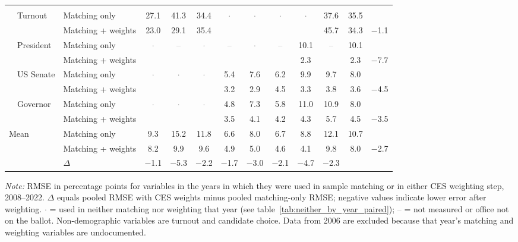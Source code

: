 \begin{table}[!htbp]
{\begin{threeparttable}
\begin{tabular}{llcccccccccc}
\addlinespace[0.3em]
\multicolumn{12}{l}{Non-demographic} \\
\addlinespace[0.1em]
~~Turnout & Matching only & 27.1 & 41.3 & 34.4 & \textcolor{gray}{$\cdot$} & \textcolor{gray}{$\cdot$} & \textcolor{gray}{$\cdot$} & \textcolor{gray}{$\cdot$} & 37.6 & 35.5 & \\
 & Matching + weights & 23.0 & 29.1 & 35.4 &  &  &  &  & 45.7 & 34.3 & $-$1.1 \\
\addlinespace[0.1em]
~~President & Matching only & \textcolor{gray}{$\cdot$} & \textcolor{gray}{--} & \textcolor{gray}{$\cdot$} & \textcolor{gray}{--} & \textcolor{gray}{$\cdot$} & \textcolor{gray}{--} & 10.1 & \textcolor{gray}{--} & 10.1 & \\
 & Matching + weights &  &  &  &  &  &  & 2.3 &  & 2.3 & $-$7.7 \\
\addlinespace[0.1em]
~~US Senate & Matching only & \textcolor{gray}{$\cdot$} & \textcolor{gray}{$\cdot$} & \textcolor{gray}{$\cdot$} & 5.4 & 7.6 & 6.2 & 9.9 & 9.7 & 8.0 & \\
 & Matching + weights &  &  &  & 3.2 & 2.9 & 4.5 & 3.3 & 3.8 & 3.6 & $-$4.5 \\
\addlinespace[0.1em]
~~Governor & Matching only & \textcolor{gray}{$\cdot$} & \textcolor{gray}{$\cdot$} & \textcolor{gray}{$\cdot$} & 4.8 & 7.3 & 5.8 & 11.0 & 10.9 & 8.0 & \\
 & Matching + weights &  &  &  & 3.5 & 4.1 & 4.2 & 4.3 & 5.7 & 4.5 & $-$3.5 \\
\midrule
Mean\tnote{b} & Matching only & 9.3 & 15.2 & 11.8 & 6.6 & 8.0 & 6.7 & 8.8 & 12.1 & 10.7 & \\
 & Matching + weights & 8.2 & 9.9 & 9.6 & 4.9 & 5.0 & 4.6 & 4.1 & 9.8 & 8.0 & $-$2.7 \\
 & $\Delta$ & $-$1.1 & $-$5.3 & $-$2.2 & $-$1.7 & $-$3.0 & $-$2.1 & $-$4.7 & $-$2.3 & & \\
\bottomrule
\end{tabular}
\begin{tablenotes}
\footnotesize
\item \textit{Note:} RMSE in percentage points for variables in the years in which they were used in sample matching or in either CES weighting step, 2008--2022. $\Delta$ equals pooled RMSE with CES weights minus pooled matching-only RMSE; negative values indicate lower error after weighting. \textcolor{gray}{$\cdot$} = used in neither matching nor weighting that year (see table~\ref{tab:neither_by_year_paired}); \textcolor{gray}{--} = not measured or office not on the ballot. Non-demographic variables are turnout and candidate choice. Data from 2006 are excluded because that year's matching and weighting variables are undocumented.

\end{tablenotes}
\end{threeparttable}}
\end{table}
